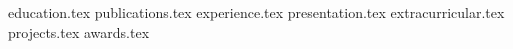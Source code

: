 \documentclass[letterpaper,11pt]{article}
\begin{document}


{education.tex}
{publications.tex}
{experience.tex}
{presentation.tex}
{extracurricular.tex}
{projects.tex}
{awards.tex}
\end{document}
